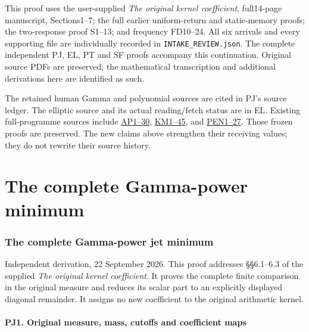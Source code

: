 \documentclass[10pt]{article}
\begin{document}
This proof uses the user-supplied \emph{The original kernel coefficient}, full14-page manuscript, Sections1--7; the full earlier uniform-return and static-memory proofs; the two-response proof S1--13; and frequency FD10--24. All six arrivals and every supporting file are individually recorded in \texttt{INTAKE\_REVIEW.json}. The complete independent PJ, EL, PT and SF proofs accompany this continuation. Original source PDFs are preserved; the mathematical transcription and additional derivations here are identified as such.

The retained human Gamma and polynomial sources are cited in PJ's source ledger. The elliptic source and its actual reading/fetch status are in EL. Existing full-programme sources include \href{https://github.com/KokunoYumeto/zeta-function-research-reader/blob/9104d852c6bc5b79e6fc4588c403128a40b7fda3/workbenches/splitzero-tandem/continuations/20260922-arithmetic-probe-mass/PROBE_PROOFS.md}{AP1--30}, \href{https://github.com/KokunoYumeto/zeta-function-research-reader/blob/9104d852c6bc5b79e6fc4588c403128a40b7fda3/workbenches/splitzero-tandem/continuations/20260922-arithmetic-probe-mass/MASS_PROOFS.md}{KM1--45}, and \href{https://github.com/KokunoYumeto/zeta-function-research-reader/blob/9104d852c6bc5b79e6fc4588c403128a40b7fda3/workbenches/splitzero-tandem/continuations/20260922-arithmetic-probe-mass/PENCIL_PROOFS.md}{PEN1--27}. Those frozen proofs are preserved. The new claims above strengthen their receiving values; they do not rewrite their source history.

\clearpage\part{The complete Gamma-power minimum}
\section{The complete Gamma-power jet minimum}\label{the-complete-gamma-power-jet-minimum}

Independent derivation, 22 September 2026. This proof addresses §§6.1--6.3 of the supplied \emph{The original kernel coefficient}. It proves the complete finite comparison in the original measure and reduces its scalar part to an explicitly displayed diagonal remainder. It assigns no new coefficient to the original arithmetic kernel.

\subsection{PJ1. Original measure, mass, cutoffs and coefficient maps}\label{pj1.-original-measure-mass-cutoffs-and-coefficient-maps}
\end{document}
